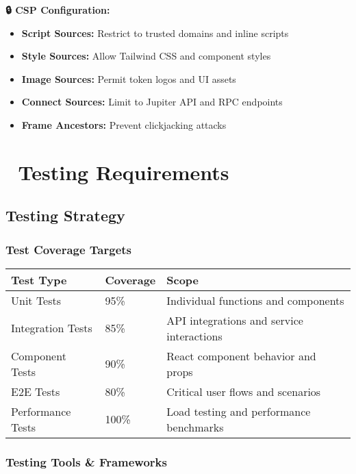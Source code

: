 \documentclass[12pt,a4paper]{article}
\begin{document}
\begin{tcolorbox}[colback=warningOrange!10,colframe=warningOrange]
\textbf{🔒 CSP Configuration:}
\begin{itemize}
    \item \textbf{Script Sources:} Restrict to trusted domains and inline scripts
    \item \textbf{Style Sources:} Allow Tailwind CSS and component styles
    \item \textbf{Image Sources:} Permit token logos and UI assets
    \item \textbf{Connect Sources:} Limit to Jupiter API and RPC endpoints
    \item \textbf{Frame Ancestors:} Prevent clickjacking attacks
\end{itemize}
\end{tcolorbox}

\section{🧪 Testing Requirements}

\subsection{Testing Strategy}

\subsubsection{Test Coverage Targets}

\begin{longtable}{|p{3cm}|p{2cm}|p{8cm}|}
\hline
\textbf{Test Type} & \textbf{Coverage} & \textbf{Scope} \\
\hline
\endhead

Unit Tests & 95\% & Individual functions and components \\
\hline
Integration Tests & 85\% & API integrations and service interactions \\
\hline
Component Tests & 90\% & React component behavior and props \\
\hline
E2E Tests & 80\% & Critical user flows and scenarios \\
\hline
Performance Tests & 100\% & Load testing and performance benchmarks \\
\hline
\end{longtable}

\subsubsection{Testing Tools \& Frameworks}
\end{document}
